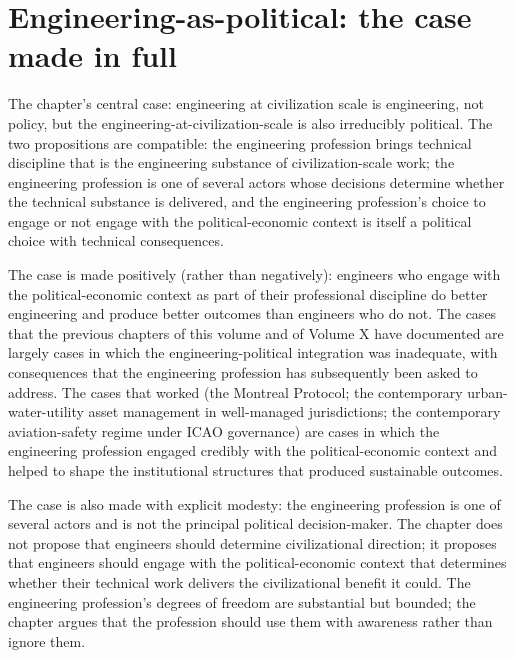 \section{Engineering-as-political: the case made in full}

The chapter's central case: engineering at civilization scale is engineering, not policy, but the engineering-at-civilization-scale is also irreducibly political. The two propositions are compatible: the engineering profession brings technical discipline that is the engineering substance of civilization-scale work; the engineering profession is one of several actors whose decisions determine whether the technical substance is delivered, and the engineering profession's choice to engage or not engage with the political-economic context is itself a political choice with technical consequences.

The case is made positively (rather than negatively): engineers who engage with the political-economic context as part of their professional discipline do better engineering and produce better outcomes than engineers who do not. The cases that the previous chapters of this volume and of Volume X have documented are largely cases in which the engineering-political integration was inadequate, with consequences that the engineering profession has subsequently been asked to address. The cases that worked (the Montreal Protocol; the contemporary urban-water-utility asset management in well-managed jurisdictions; the contemporary aviation-safety regime under ICAO governance) are cases in which the engineering profession engaged credibly with the political-economic context and helped to shape the institutional structures that produced sustainable outcomes.

The case is also made with explicit modesty: the engineering profession is one of several actors and is not the principal political decision-maker. The chapter does not propose that engineers should determine civilizational direction; it proposes that engineers should engage with the political-economic context that determines whether their technical work delivers the civilizational benefit it could. The engineering profession's degrees of freedom are substantial but bounded; the chapter argues that the profession should use them with awareness rather than ignore them.


